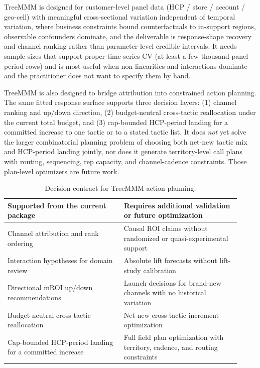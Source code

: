 \documentclass[review,12pt]{elsarticle}
\begin{document}
TreeMMM is designed for customer-level panel data (HCP / store / account /
geo-cell) with meaningful cross-sectional variation independent of temporal
variation, where business constraints bound counterfactuals to in-support
regions, observable confounders dominate, and the deliverable is response-shape
recovery and channel ranking rather than parameter-level credible intervals.
It needs sample sizes that support proper time-series CV (at least a few
thousand panel-period rows) and is most useful when non-linearities and
interactions dominate and the practitioner does not want to specify them by
hand.

TreeMMM is also designed to bridge attribution into constrained action
planning. The same fitted response surface supports three decision layers:
(1) channel ranking and up/down direction, (2) budget-neutral cross-tactic
reallocation under the current total budget, and (3) cap-bounded HCP-period
landing for a committed increase to one tactic or to a stated tactic list. It
does \emph{not} yet solve the larger combinatorial planning problem of choosing
both net-new tactic mix and HCP-period landing jointly, nor does it generate
territory-level call plans with routing, sequencing, rep capacity, and
channel-cadence constraints. Those plan-level optimizers are future work.

\begin{table}[ht]
\centering
\caption{Decision contract for TreeMMM action planning.}
\label{tab:decision_contract}
\begin{tabular}{@{}p{0.46\linewidth}p{0.46\linewidth}@{}}
\toprule
Supported from the current package & Requires additional validation or future optimization \\
\midrule
Channel attribution and rank ordering & Causal ROI claims without randomized or quasi-experimental support \\
Interaction hypotheses for domain review & Absolute lift forecasts without lift-study calibration \\
Directional mROI up/down recommendations & Launch decisions for brand-new channels with no historical variation \\
Budget-neutral cross-tactic reallocation & Net-new cross-tactic increment optimization \\
Cap-bounded HCP-period landing for a committed increase & Full field plan optimization with territory, cadence, and routing constraints \\
\bottomrule
\end{tabular}
\end{table}
\end{document}
